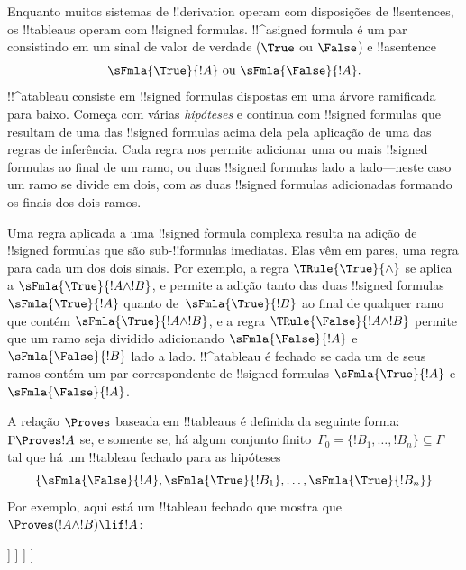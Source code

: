 \documentclass[../../../include/open-logic-section]{subfiles}
\begin{document}
      {}
      {}


Enquanto muitos sistemas de !!{derivation} operam com disposições de
!!{sentence}s, os !!{tableau}s operam com !!{signed formula}s.
!!^a{signed formula} é um par consistindo em um sinal de valor de
verdade ($\True$ ou $\False$) e !!a{sentence}
\[
\sFmla{\True}{!A} \text{ ou } \sFmla{\False}{!A}.
\]
!!^a{tableau} consiste em !!{signed formula}s dispostas em uma
árvore ramificada para baixo. Começa com várias \emph{hipóteses}
e continua com !!{signed formula}s que resultam de uma das
!!{signed formula}s acima dela pela aplicação de uma das regras de
inferência. Cada regra nos permite adicionar uma ou mais !!{signed
  formula}s ao final de um ramo, ou duas !!{signed formula}s lado a
lado---neste caso um ramo se divide em dois, com as duas !!{signed
  formula}s adicionadas formando os finais dos dois ramos.

Uma regra aplicada a uma !!{signed formula} complexa resulta na adição
de !!{signed formula}s que são sub-!!{formula}s imediatas. Elas vêm
em pares, uma regra para cada um dos dois sinais.  Por exemplo, a
regra $\TRule{\True}{\land}$ se aplica a $\sFmla{\True}{!A \land !B}$,
e permite a adição tanto das duas !!{signed formula}s
$\sFmla{\True}{!A}$ quanto de~$\sFmla{\True}{!B}$ ao final de qualquer ramo
que contém $\sFmla{\True}{!A \land !B}$, e a regra
$\TRule{\False}{!A \land !B}$ permite que um ramo seja dividido
adicionando $\sFmla{\False}{!A}$ e $\sFmla{\False}{!B}$ lado a lado.
!!^a{tableau} é fechado se cada um de seus ramos contém um
par correspondente de !!{signed formula}s $\sFmla{\True}{!A}$ e
$\sFmla{\False}{!A}$.

A relação $\Proves$ baseada em !!{tableau}s é definida da seguinte
forma: $\Gamma \Proves !A$ se, e somente se, há algum conjunto
finito~$\Gamma_0 = \{!B_1, \dots, !B_n\} \subseteq \Gamma$ tal que há
um !!{tableau} fechado para as hipóteses
\[
\{\sFmla{\False}{!A}, \sFmla{\True}{!B_1}, \dots, \sFmla{\True}{!B_n}\} 
\]
Por exemplo, aqui está um !!{tableau} fechado que mostra que $\Proves
(!A \land !B) \lif !A$:
\begin{oltableau}
  [\sFmla{\False}{(\formula{A} \land \formula{B}) \lif \formula{A}}, just = \TAss
    [\sFmla{\True}{\formula{A} \land \formula{B}}, just = {\TRule{\False}{\lif}[1]}
      [\sFmla{\False}{\formula{A}}, just = {\TRule{\False}{\lif}[1]}
        [\sFmla{\True}{\formula{A}}, just = {\TRule{\True}{\lif}[2]}
          [\sFmla{\True}{\formula{B}}, just = {\TRule{\True}{\lif}[2]}, close]
        ]
      ]
    ]
  ]
\end{oltableau}
\end{document}

